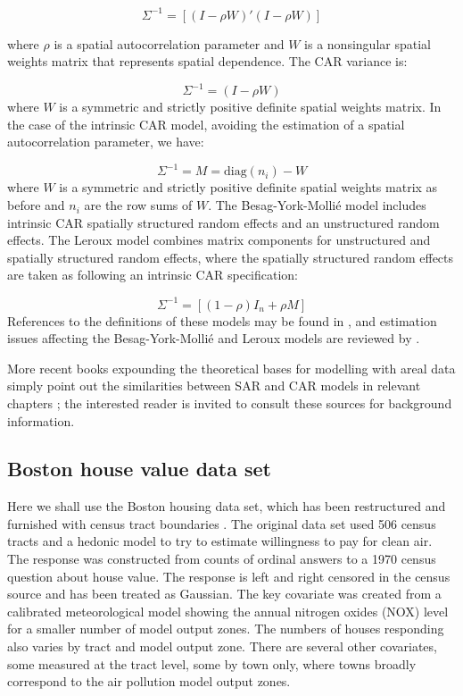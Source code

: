 \documentclass[]{book}
\begin{document}
\[
\Sigma^{-1} = [(I - \rho W)'(I - \rho W)]
\]

where \(\rho\) is a spatial autocorrelation parameter and \(W\) is a nonsingular spatial weights matrix that represents spatial dependence. The CAR variance is:

\[
\Sigma^{-1} = (I - \rho W)
\]
where \(W\) is a symmetric and strictly positive definite spatial weights matrix. In the case of the intrinsic CAR model, avoiding the estimation of a spatial autocorrelation parameter, we have:

\[
\Sigma^{-1} = M = \mathrm{diag}(n_i) - W
\]
where \(W\) is a symmetric and strictly positive definite spatial weights matrix as before and \(n_i\) are the row sums of \(W\). The Besag-York-Mollié model includes intrinsic CAR spatially structured random effects and an unstructured random effects. The Leroux model combines matrix components for unstructured and spatially structured random effects, where the spatially structured random effects are taken as following an intrinsic CAR specification:

\[
\Sigma^{-1} = [(1 - \rho) I_n + \rho M]
\]
References to the definitions of these models may be found in \citet{gómez2020bayesian}, and estimation issues affecting the Besag-York-Mollié and Leroux models are reviewed by \citet{JSSv063c01}.

More recent books expounding the theoretical bases for modelling with areal data simply point out the similarities between SAR and CAR models in relevant chapters \citep{gaetan+guyon:10, vanlieshout:19}; the interested reader is invited to consult these sources for background information.

\hypertarget{boston-house-value-data-set}{%
\subsection{Boston house value data set}\label{boston-house-value-data-set}}

Here we shall use the Boston housing data set, which has been restructured and furnished with census tract boundaries \citep{bivand17}. The original data set used 506 census tracts and a hedonic model to try to estimate willingness to pay for clean air. The response was constructed from counts of ordinal answers to a 1970 census question about house value. The response is left and right censored in the census source and has been treated as Gaussian. The key covariate was created from a calibrated meteorological model showing the annual nitrogen oxides (NOX) level for a smaller number of model output zones. The numbers of houses responding also varies by tract and model output zone. There are several other covariates, some measured at the tract level, some by town only, where towns broadly correspond to the air pollution model output zones.
\end{document}

